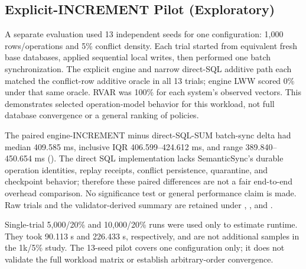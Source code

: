 \documentclass[runningheads]{llncs}
\begin{document}
\subsection{Explicit-INCREMENT Pilot (Exploratory)}
A separate evaluation used 13 independent seeds for one configuration: 1,000 rows/operations and 5\% conflict density. Each trial started from equivalent fresh base databases, applied sequential local writes, then performed one batch synchronization. The explicit engine \texttt{} and narrow direct-SQL additive path each matched the conflict-row additive oracle in all 13 trials; engine LWW scored 0\% under that same oracle. RVAR was 100\% for each system's observed \texttt{} vectors. This demonstrates selected operation-model behavior for this workload, not full database convergence or a general ranking of policies.

The paired engine-INCREMENT minus direct-SQL-SUM batch-sync delta had median 409.585 ms, inclusive IQR 406.599–424.612 ms, and range 389.840–450.654 ms (\texttt{}). The direct SQL implementation lacks SemanticSync's durable operation identities, replay receipts, conflict persistence, quarantine, and checkpoint behavior; therefore these paired differences are not a fair end-to-end overhead comparison. No significance test or general performance claim is made. Raw trials and the validator-derived summary are retained under \texttt{}, \texttt{}, and \texttt{}.

Single-trial 5,000/20\% and 10,000/20\% runs were used only to estimate runtime. They took 90.113 s and 226.433 s, respectively, and are not additional samples in the 1k/5\% study. The 13-seed pilot covers one configuration only; it does not validate the full workload matrix or establish arbitrary-order convergence.
\end{document}
